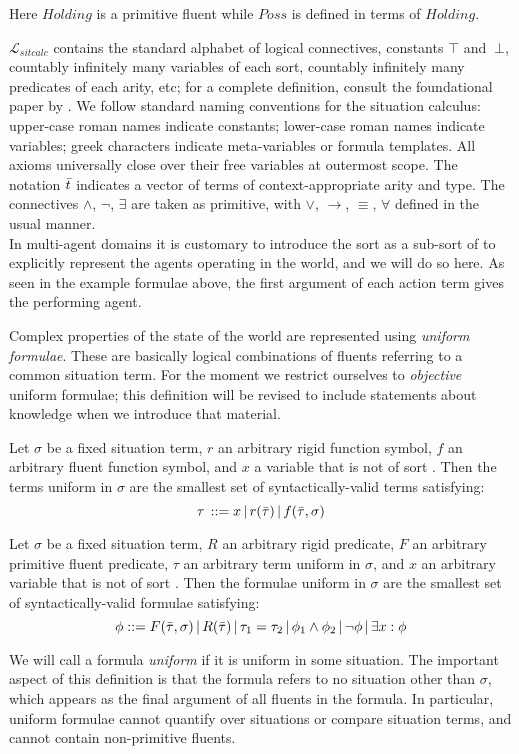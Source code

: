 Here $Holding$ is a primitive fluent while $Poss$ is defined in
terms of $Holding$.\medskip{}


$\mathcal{L}_{sitcalc}$ contains the standard alphabet of logical
connectives, constants $\top$ and $\ \bot$, countably infinitely
many variables of each sort, countably infinitely many predicates
of each arity, etc; for a complete definition, consult the foundational
paper by \citet{pirri99contributions_sitcalc}. We follow standard
naming conventions for the situation calculus: upper-case roman names
indicate constants; lower-case roman names indicate variables; greek
characters indicate meta-variables or formula templates. All axioms
universally close over their free variables at outermost scope. The
notation $\bar{t}$ indicates a vector of terms of context-appropriate
arity and type. The connectives $\wedge$, $\neg$, $\exists$ are
taken as primitive, with $\vee$, $\rightarrow$, $\equiv$, $\forall$
defined in the usual manner.\\


In multi-agent domains it is customary to introduce the sort as a sub-sort of  to explicitly represent the agents
operating in the world, and we will do so here. As seen in the example
formulae above, the first argument of each action term gives the performing
agent.

\medskip{}
 Complex properties of the state of the world are represented using
\emph{uniform formulae}. These are basically logical combinations
of fluents referring to a common situation term. For the moment we
restrict ourselves to \emph{objective} uniform formulae; this definition
will be revised to include statements about knowledge when we introduce
that material.

\begin{defnL}
 Let $\sigma$ be a fixed situation term,
$r$ an arbitrary rigid function symbol, $f$ an arbitrary fluent
function symbol, and $x$ a variable that is not of sort .
Then the terms uniform in $\sigma$ are the smallest set of syntactically-valid
terms satisfying:\[
\tau\,::=x\,|\, r(\bar{\tau})\,|\, f(\bar{\tau},\sigma)\]

\begin{defnL}
 Let $\sigma$ be a fixed situation
term, $R$ an arbitrary rigid predicate, $F$ an arbitrary primitive
fluent predicate, $\tau$ an arbitrary term uniform in $\sigma$,
and $x$ an arbitrary variable that is not of sort .
Then the formulae uniform in $\sigma$ are the smallest set of syntactically-valid
formulae satisfying:\[
\phi::=F(\bar{\tau},\sigma)\,|\, R(\bar{\tau})\,|\,\tau_{1}=\tau_{2}\,|\,\phi_{1}\wedge\phi_{2}\,|\,\neg\phi\,|\,\exists x:\phi\]

\end{defnL}
\end{defnL}
We will call a formula \emph{uniform} if it is uniform in some situation.
The important aspect of this definition is that the formula refers
to no situation other than $\sigma$, which appears as the final argument
of all fluents in the formula. In particular, uniform formulae cannot
quantify over situations or compare situation terms, and cannot contain
non-primitive fluents.

